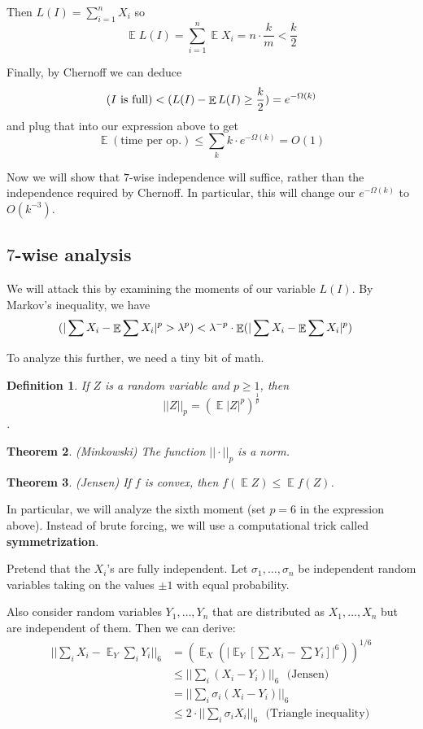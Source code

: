 \documentclass[11pt]{article}
\DeclareMathOperator*{\E}{\mathbb{E}}
\let\Pr\relax
\DeclareMathOperator*{\Pr}{\mathbb{P}}
\newtheorem{theorem}{Theorem}
\newtheorem{definition}[theorem]{Definition}
\begin{document}
Then $L(I) = \sum_{i=1}^n X_i$ so $$\E L(I) = \sum_{i=1}^n \E X_i = n \cdot \frac{k}{m} < \frac{k}{2}$$

Finally, by Chernoff we can deduce
$$\Pr( \text{$I$ is full}) < \Pr(L(I) - \E L(I) \geq \frac{k}{2}) = e^{-\Omega(k)}$$
and plug that into our expression above to get
$$\E(\text{time per op.}) \leq \sum_k k \cdot e^{-\Omega(k)} = O(1)$$

Now we will show that $7$-wise independence will suffice, rather than the independence required by Chernoff. In particular, this will change our $e^{-\Omega(k)}$ to $O(k^{-3})$. 

\subsection{$7$-wise analysis}

We will attack this by examining the moments of our variable $L(I)$. By Markov's inequality, we have
\begin{align*}
  \Pr(|\sum X_i - \E \sum X_i|^p > \lambda^p) &< \lambda^{-p} \cdot \E(|\sum X_i - \E \sum X_i|^p)
\end{align*}

To analyze this further, we need a tiny bit of math.

\begin{definition}
  If $Z$ is a random variable and $p \geq 1$, then $$||Z||_p = (\E |Z|^p)^{\frac{1}{p}}$$.
\end{definition}

\begin{theorem}
  (Minkowski) The function $||\cdot||_p$ is a norm. 
  \label{thm:minkowski}
\end{theorem}

\begin{theorem}
  (Jensen) If $f$ is convex, then $f(\E Z) \leq \E f(Z)$. 
  \label{thm:jensen}
\end{theorem}

In particular, we will analyze the sixth moment (set $p = 6$ in the expression above). Instead of brute forcing, we will use a computational trick called \textbf{symmetrization}. 

Pretend that the $X_i$'s are fully independent. Let $\sigma_1, \dots, \sigma_n$ be independent random variables taking on the values $\pm 1$ with equal probability. 

Also consider random variables $Y_1, \dots, Y_n$ that are distributed as $X_1, \dots, X_n$ but are independent of them. Then we can derive:
\begin{align*}
  ||\sum_i X_i - \E_Y \sum_i Y_i||_6 &= ( \E_X (|\E_Y[\sum X_i - \sum Y_i]|^6))^{1/6} \\
  &\leq ||\sum_i (X_i - Y_i)||_6 \,\,\text{ (Jensen)} \\
  &= ||\sum_i \sigma_i(X_i - Y_i)||_6 \\
  &\leq 2 \cdot ||\sum_i \sigma_iX_i||_6 \,\,\text{ (Triangle inequality)}
\end{align*}
\end{document}
